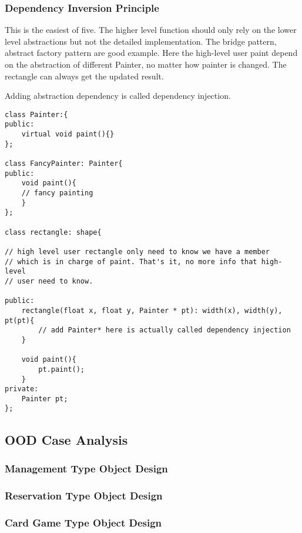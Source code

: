 \subsubsection{Dependency Inversion Principle}

This is the easiest of five. The higher level function should only rely on the lower level abstractions but not the detailed implementation.
The bridge pattern, abstract factory pattern are good example. Here the high-level user paint depend on the abstraction of different Painter,
no matter how painter is changed. The rectangle can always get the updated result.

Adding abstraction dependency is called dependency injection.

\begin{lstlisting}
class Painter:{
public:
	virtual void paint(){}
};

class FancyPainter: Painter{
public:
	void paint(){
	// fancy painting
	}
};

class rectangle: shape{

// high level user rectangle only need to know we have a member
// which is in charge of paint. That's it, no more info that high-level
// user need to know.

public:
	rectangle(float x, float y, Painter * pt): width(x), width(y), pt(pt){
		// add Painter* here is actually called dependency injection
	}

	void paint(){
		pt.paint();
	}
private:
	Painter pt;
};

\end{lstlisting}

\newpage
\subsection{OOD Case Analysis}
\subsubsection{Management Type Object Design}
\subsubsection{Reservation Type Object Design}
\subsubsection{Card Game Type Object Design}
